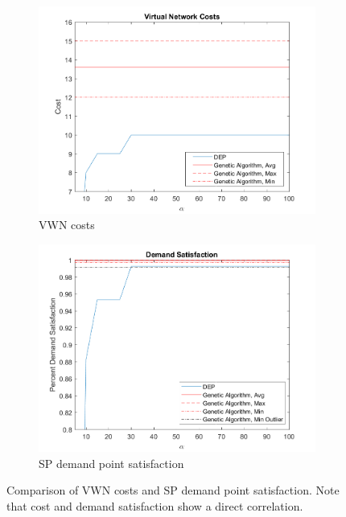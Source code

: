 \documentclass[onecolumn,draftcls]{IEEEtran}
\begin{document}
\begin{figure}
\begin{subfigure}{.5\textwidth}
	\centering
	\includegraphics[width=.8\linewidth]{Figures/ComparisonCost}
	\caption{VWN costs}
	\label{fig:VWNCompCost}
\end{subfigure}
\begin{subfigure}{.5\textwidth}
	\centering
	\includegraphics[width=.8\linewidth]{Figures/ComparisonSatisfaction}
	\caption{SP demand point satisfaction}
	\label{fig:VWNCompSatis}
\end{subfigure}
\caption{Comparison of VWN costs and SP demand point satisfaction.  Note that cost and demand satisfaction show a direct correlation.}
\label{fig:VWNComp}
\end{figure}
\end{document}

